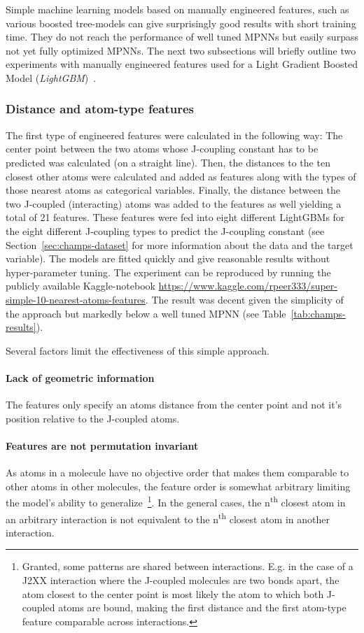 Simple machine learning models based on manually engineered features, such as various boosted tree-models can give surprisingly good results with short training time. They do not reach the performance of well tuned MPNNs but easily surpass not yet fully optimized MPNNs. The next two subsections will briefly outline two experiments with manually engineered features used for a Light Gradient Boosted Model (\textit{LightGBM})~\cite{Ke2017}.


\subsubsection{Distance and atom-type features}
\label{sec:dist-atom-type}

The first type of engineered features were calculated in the following way: The center point between the two atoms whose J-coupling constant has to be predicted was calculated (on a straight line). Then, the distances to the ten closest other atoms were calculated and added as features along with the types of those nearest atoms as categorical variables. Finally, the distance between the two J-coupled (interacting) atoms was added to the features as well yielding a total of 21 features. These features were fed into eight different LightGBMs
for the eight different J-coupling types to predict the J-coupling constant (see Section~\ref{sec:champs-dataset} for more information about the data and the target variable). The models are fitted quickly and give reasonable results without hyper-parameter tuning. The experiment can be reproduced by running the publicly available Kaggle-notebook \url{https://www.kaggle.com/rpeer333/super-simple-10-nearest-atoms-features}. The result was decent given the simplicity of the approach but markedly below a well tuned MPNN (see Table~\ref{tab:champs-results}).

\noindent Several factors limit the effectiveness of this simple approach.

\paragraph*{Lack of geometric information} The features only specify an atoms distance from the center point and not it's position relative to the J-coupled atoms.

\paragraph*{Features are not permutation invariant} As atoms in a molecule have no objective order that makes them comparable to other atoms in other molecules, the feature order is somewhat arbitrary limiting the model's ability to generalize~\footnote{
	Granted, some patterns are shared between interactions. E.g. in the case of a J2XX interaction where the J-coupled molecules are two bonds apart, the atom closest to the center point is most likely the atom to which both J-coupled atoms are bound, making the first distance and the first atom-type feature comparable across interactions.
}. In the general cases, the n\textsuperscript{th} closest atom in an arbitrary interaction is not equivalent to the n\textsuperscript{th} closest atom in another interaction.

